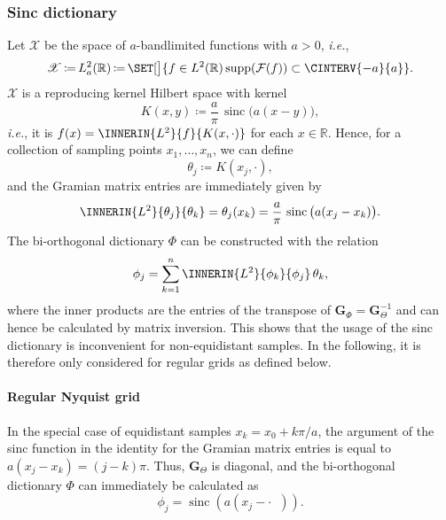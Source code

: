 \documentclass[a4paper]{paper}
\newcommand*{\SPC}[1]{{\ensuremath{\mathscr{#1}}}}
\newcommand*{\SPCX}{\SPC{X}}
\newcommand{\RR}{{\ensuremath{\mathbb{R}}}}
\newcommand*{\OP}[1]{{\ensuremath{\mathcal{#1}}}}
\newcommand*{\FT}{\OP{F}}
\providecommand\GIVEN{}  %
\DeclareMathOperator{\SUPP}{{supp}}
\DeclareMathOperator{\SINC}{{sinc}}
\DeclareMathOperator{\DEFEQ}{{\coloneqq}}
\newcommand*{\ie}{\textsl{i.e.}\xspace}
\newcommand*{\BDG}{\boldsymbol{G}}
\begin{document}
\subsubsection{Sinc dictionary}
\label{subsubsec:specif:interp:sinc}

Let $\SPCX$ be the space of $a$-bandlimited functions with $a > 0$, \ie, 
%
\begin{equation*}
 \SPCX \DEFEQ L^2_a(\RR) \DEFEQ \SET[\big]{f \in L^2(\RR) \GIVEN \SUPP(\FT(f)) \subset \CINTERV{-a}{a}}.
\end{equation*}
%
$\SPCX$ is a reproducing kernel Hilbert space with kernel
%
\begin{equation*}
 K(x,y) \DEFEQ \frac{a}{\pi}\, \SINC\big( a(x-y) \big),
\end{equation*}
%
\ie, it is $f(x) = \INNERIN{L^2}{f}{K(x, \cdot)}$ for each $x\in \RR$. Hence, for a collection of sampling points $x_1, 
\dots, x_n$, we can define
%
\begin{equation*}
 \theta_j \DEFEQ K(x_j, \cdot),
\end{equation*}
%
and the Gramian matrix entries are immediately given by 
%
\begin{equation*}
 \INNERIN{L^2}{\theta_j}{\theta_k} = \theta_j(x_k) 
 = \frac{a}{\pi}\, \SINC\big( a(x_j - x_k) \big).
\end{equation*}
%
The bi-orthogonal dictionary $\Phi$ can be constructed with the relation
%
\begin{equation*}
 \phi_j = \sum_{k=1}^n \INNERIN{L^2}{\phi_k}{\phi_j}\, \theta_k,
\end{equation*}
%
where the inner products are the entries of the transpose of $\BDG_\Phi = \BDG_\Theta^{-1}$ and can hence be calculated 
by matrix inversion. This shows that the usage of the sinc dictionary is inconvenient for non-equidistant samples. 
In the following, it is therefore only considered for regular grids as defined below.

\paragraph{Regular Nyquist grid}

In the special case of equidistant samples $x_k = x_0 + k\pi/a$, the argument of the 
sinc function in the identity for the Gramian matrix entries is equal to $a(x_j - x_k) = (j-k)\pi$. Thus, 
$\BDG_\Theta$ is diagonal, and the bi-orthogonal dictionary $\Phi$ can immediately be calculated as
%
\begin{equation*}
 \phi_j = \SINC( a(x_j - \cdot\phantom{x}\!\!)).
\end{equation*}
\end{document}
